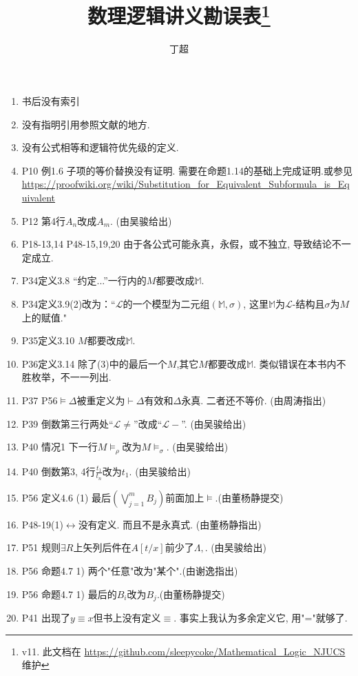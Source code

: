 \documentclass{article}
\begin{document}
\title{数理逻辑讲义勘误表\footnote{v11. 此文档在 \url{ https://github.com/sleepycoke/Mathematical_Logic_NJUCS} 维护}}
\author{丁超}
\maketitle	
\begin{enumerate}
\item 书后没有索引
\item 没有指明引用参照文献的地方.
\item 没有公式相等和逻辑符优先级的定义. 
\item P10 例1.6 子项的等价替换没有证明. 需要在命题1.14的基础上完成证明.或参见\\ \url{https://proofwiki.org/wiki/Substitution_for_Equivalent_Subformula_is_Equivalent}
\item P12 第4行$A_n$改成$A_m$. (由吴骏给出)
\item P18-13,14 P48-15,19,20 由于各公式可能永真，永假，或不独立, 导致结论不一定成立. 
\item P34定义3.8 “约定...”一行内的$M$都要改成$\mathbb{M}$. 
\item P34定义3.9(2)改为：“$\mathscr{L}$的一个模型为二元组$(\mathbb{M},\sigma)$, 这里$\mathbb{M}$为$\mathscr{L}$-结构且$\sigma$为$M$上的赋值."
\item P35定义3.10 $M$都要改成$\mathbb{M}$. 
\item P36定义3.14 除了(3)中的最后一个$M$,其它$M$都要改成$\mathbb{M}$. 类似错误在本书内不胜枚举，不一一列出. 
\item P37 P56$\models \Delta$被重定义为$\vdash \Delta$有效和$\Delta$永真. 二者还不等价. (由周涛指出)
\item P39 倒数第三行两处``$\mathscr{L}\ne$''改成``$\mathscr{L}-$''. (由吴骏给出)
\item P40 情况1 下一行$M\models_\rho$改为$M\models_\sigma$. (由吴骏给出)
\item P40 倒数第3, 4行$\frac{t_1}{t_n}$改为$t_1$. (由吴骏给出)\item P56 定义4.6 (1) 最后\((\bigvee\limits_{j=1}^m B_j)\)前面加上\(\models\).(由董杨静提交)
\item P48-19(1)$\leftrightarrow$没有定义. 而且不是永真式. (由董杨静指出)
\item P51 规则$\exists R$上矢列后件在$A[t/x]$前少了$\Lambda, $. (由吴骏给出)
\item P56 命题4.7 1) 两个"任意"改为"某个".(由谢逸指出)
\item P56 命题4.7 1) 最后的\(B_i\)改为\(B_j\).(由董杨静提交)
\item P41 出现了$y\equiv x$但书上没有定义$\equiv$. 事实上我认为多余定义它, 用"="就够了. 

\end{enumerate}
\end{document}
